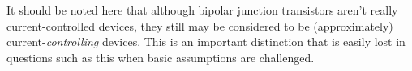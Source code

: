 It should be noted here that although bipolar junction transistors aren't really current-controlled devices, they still may be considered to be (approximately) current-{\it controlling} devices.  This is an important distinction that is easily lost in questions such as this when basic assumptions are challenged.




